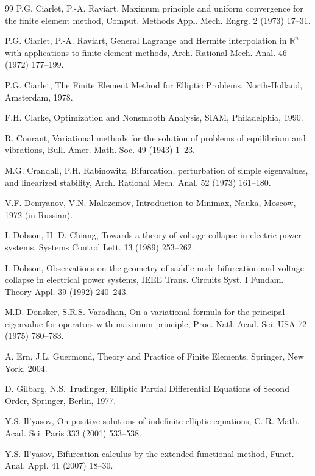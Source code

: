 \documentclass[preprint,10pt]{elsarticle}
\numberwithin{equation}{section}
\begin{document}
\begin{thebibliography}{99}
	P.G. Ciarlet, P.-A. Raviart, Maximum principle and uniform convergence for the
	finite element method, Comput. Methods Appl. Mech. Engrg. 2 (1973) 17--31.
	
	P.G. Ciarlet, P.-A. Raviart, General Lagrange and Hermite interpolation in
	\(\mathbb R^n\) with applications to finite element methods, Arch. Rational
	Mech. Anal. 46 (1972) 177--199.
	
	P.G. Ciarlet, The Finite Element Method for Elliptic Problems, North-Holland,
	Amsterdam, 1978.
	
	F.H. Clarke, Optimization and Nonsmooth Analysis, SIAM, Philadelphia, 1990.
	
	R. Courant, Variational methods for the solution of problems of equilibrium and
	vibrations, Bull. Amer. Math. Soc. 49 (1943) 1--23.
	
	M.G. Crandall, P.H. Rabinowitz, Bifurcation, perturbation of simple
	eigenvalues, and linearized stability, Arch. Rational Mech. Anal. 52 (1973)
	161--180.
	
	V.F. Demyanov, V.N. Malozemov, Introduction to Minimax, Nauka, Moscow, 1972
	(in Russian).
	
	I. Dobson, H.-D. Chiang, Towards a theory of voltage collapse in electric
	power systems, Systems Control Lett. 13 (1989) 253--262.
	
	I. Dobson, Observations on the geometry of saddle node bifurcation and voltage
	collapse in electrical power systems, IEEE Trans. Circuits Syst. I Fundam.
	Theory Appl. 39 (1992) 240--243.
	
	M.D. Donsker, S.R.S. Varadhan, On a variational formula for the principal
	eigenvalue for operators with maximum principle, Proc. Natl. Acad. Sci. USA 72
	(1975) 780--783.
	
	A. Ern, J.L. Guermond, Theory and Practice of Finite Elements, Springer,
	New York, 2004.
	
	D. Gilbarg, N.S. Trudinger, Elliptic Partial Differential Equations of Second
	Order, Springer, Berlin, 1977.
	
	Y.S. Il'yasov, On positive solutions of indefinite elliptic equations,
	C. R. Math. Acad. Sci. Paris 333 (2001) 533--538.
	
	Y.S. Il'yasov, Bifurcation calculus by the extended functional method,
	Funct. Anal. Appl. 41 (2007) 18--30.
	

\end{thebibliography}
\end{document}
